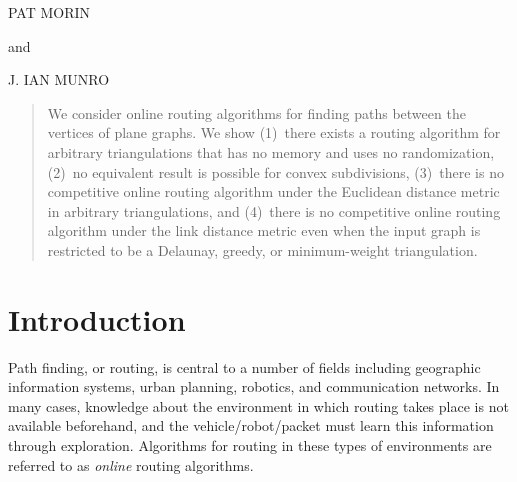 \documentclass{article}
\begin{document}
\begin{center}
\vspace{2pt}


\vspace{10pt}
{\authorfont \MakeUppercase{Pat Morin}}

\vspace{2pt}


\vspace{10pt}

and

\vspace{10pt}

{\authorfont \MakeUppercase{J. Ian Munro}}

\vspace{2pt}


\vspace{10pt}

\vspace{20pt}
\end{center}

\alphfootnote


\begin{abstract}
We consider online routing algorithms for finding paths between the
 vertices of plane graphs.  We show (1)~there exists a routing
algorithm for arbitrary triangulations that has no memory and uses
no randomization, (2)~no equivalent result is possible for convex
subdivisions, (3)~there is no competitive online routing algorithm
under the Euclidean distance metric in arbitrary triangulations, and
(4)~there is no competitive online routing algorithm under the link
distance metric even when the input graph is restricted to be a Delaunay,
greedy, or minimum-weight triangulation.
\end{abstract}

\textlineskip
\section{Introduction}

Path finding, or routing, is central to a number of fields including
geographic information systems, urban planning, robotics, and
communication networks.  In many cases, knowledge about the
environment in which routing takes place is not available beforehand,
and the vehicle/robot/packet must learn this information through
exploration.  Algorithms for routing in these types of environments
are referred to as \emph{online} \cite{be98} routing algorithms.
\end{document}
